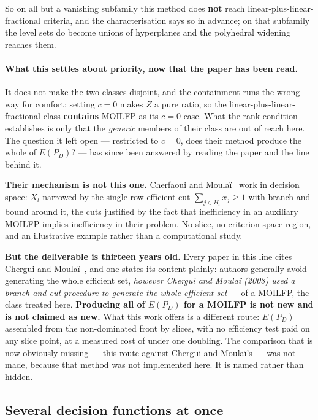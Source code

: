 \documentclass[11pt,a4paper]{article}
\newcommand{\Dset}{D}
\newcommand{\E}{E(P_{\Dset})}
\begin{document}
So on all but a vanishing subfamily this method does \textbf{not} reach
linear-plus-linear-fractional criteria, and the characterisation says so in
advance; on that subfamily the level sets do become unions of hyperplanes
and the polyhedral widening reaches them.

\paragraph{What this settles about priority, now that the paper has been
read.}
It does not make the two classes disjoint, and the containment runs the
wrong way for comfort: setting $c = 0$ makes $Z$ a pure ratio, so the
linear-plus-linear-fractional class \textbf{contains} MOILFP as its $c = 0$
case.  What the rank condition establishes is only that the \emph{generic}
members of their class are out of reach here.  The question it left open ---
restricted to $c = 0$, does their method produce the whole of $\E$? --- has
since been answered by reading the paper and the line behind it.

\textbf{Their mechanism is not this one.}  Cherfaoui and
Moula\"i~\cite{cherfaoui2021} work in decision space: $X_l$ narrowed by the
single-row efficient cut $\sum_{j \in H_l} x_j \geqslant 1$ with
branch-and-bound around it, the cuts justified by the fact that inefficiency
in an auxiliary MOILFP implies inefficiency in their problem.  No slice, no
criterion-space region, and an illustrative example rather than a
computational study.

\textbf{But the deliverable is thirteen years old.}  Every paper in this
line cites Chergui and Moula\"i~\cite{cherguimoulai2008}, and one states its
content plainly: authors generally avoid generating the whole efficient set,
\emph{however Chergui and Moula\"i (2008) used a branch-and-cut procedure to
generate the whole efficient set} --- of a MOILFP, the class treated here.
\textbf{Producing all of $\E$ for a MOILFP is not new and is not claimed as
new.}  What this work offers is a different route: $\E$ assembled from the
non-dominated front by slices, with no efficiency test paid on any slice
point, at a measured cost of under one doubling.  The comparison that is now
obviously missing --- this route against Chergui and Moula\"i's --- was not
made, because that method was not implemented here.  It is named rather than
hidden.

\subsection{Several decision functions at once}
\end{document}
